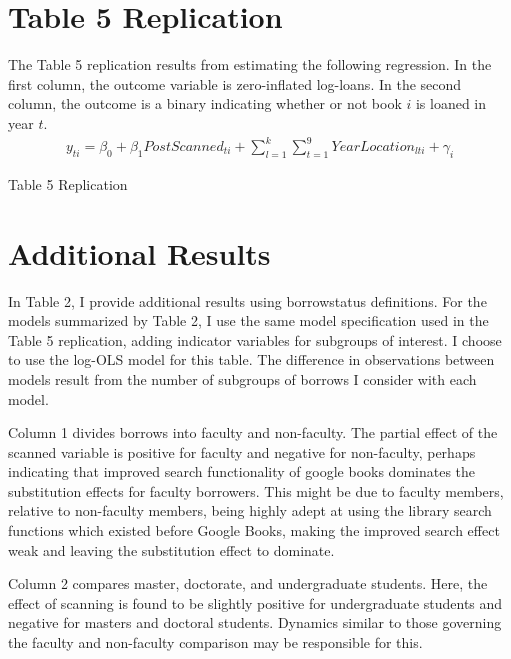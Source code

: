 \documentclass{article}
\begin{document}
\section*{Table 5 Replication}
The Table 5 replication results from estimating the following regression. In the first column, the outcome variable is zero-inflated log-loans. In the second column, the outcome is a binary indicating whether or not book $i$ is loaned in year $t$.
\begin{align}
y_{ti} = \beta_0 + \beta_1PostScanned_{ti} + \sum_{l=1}^k\sum_{t=1}^9{YearLocation_{lti}} + \gamma_i 
\end{align}

\begin{table}[htbp]
   \centering
   \caption{Table 5 Replication}
  
   \label{tab:booktabs}
\end{table}





\section*{Additional Results}
In Table 2, I provide additional results using borrowstatus definitions. For the models summarized by Table 2, I use the same model specification used in the Table 5 replication, adding indicator variables for subgroups of interest. I choose to use the log-OLS model for this table. The difference in observations between models result from the number of subgroups of borrows I consider with each model. 

Column 1 divides borrows into faculty and non-faculty. The partial effect of the scanned variable is positive for faculty and negative for non-faculty, perhaps indicating that improved search functionality of google books dominates the substitution effects for faculty borrowers. This might be due to faculty members, relative to non-faculty members, being highly adept at using the library search functions which existed before Google Books, making the improved search effect weak and leaving the substitution effect to dominate. 

Column 2 compares master, doctorate, and undergraduate students. Here, the effect of scanning is found to be slightly positive for undergraduate students and negative for masters and doctoral students. Dynamics similar to those governing the faculty and non-faculty comparison may be responsible for this. 
\end{document}
